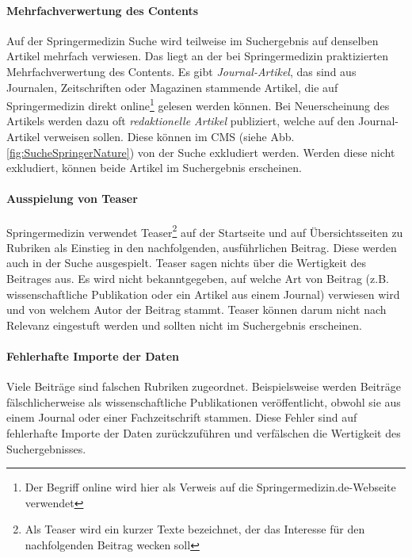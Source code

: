 \paragraph{Mehrfachverwertung des Contents}
Auf der Springermedizin Suche wird teilweise im Suchergebnis auf denselben Artikel mehrfach  verwiesen. Das liegt an der bei Springermedizin praktizierten Mehrfachverwertung des Contents. Es gibt \textit{Journal-Artikel}, das sind aus Journalen, Zeitschriften oder Magazinen stammende Artikel, die auf Springermedizin direkt online\footnote{Der Begriff \glqq online\grqq{} wird hier als Verweis auf die Springermedizin.de-Webseite verwendet} gelesen werden können. Bei Neuerscheinung des Artikels werden dazu oft \textit{redaktionelle Artikel} publiziert, welche auf den Journal-Artikel verweisen sollen. Diese können im CMS (siehe Abb. \ref{fig:SucheSpringerNature}) von der Suche exkludiert werden. Werden diese nicht exkludiert, können beide Artikel im Suchergebnis erscheinen.

\paragraph{Ausspielung von Teaser}
Springermedizin verwendet Teaser\footnote{Als Teaser wird ein kurzer Texte bezeichnet, der das Interesse für den nachfolgenden Beitrag wecken soll} auf der Startseite und auf Übersichtsseiten zu Rubriken als Einstieg in den nachfolgenden, ausführlichen Beitrag. Diese werden auch in der Suche ausgespielt. Teaser sagen nichts über die Wertigkeit des Beitrages aus. Es wird nicht bekanntgegeben, auf welche Art von Beitrag (z.B. wissenschaftliche Publikation oder ein Artikel aus einem Journal) verwiesen wird und von welchem Autor der Beitrag stammt. Teaser können darum nicht nach Relevanz eingestuft werden und sollten nicht im Suchergebnis erscheinen.

\paragraph{Fehlerhafte Importe der Daten}
Viele Beiträge sind falschen Rubriken zugeordnet. Beispielsweise werden Beiträge fälschlicherweise als wissenschaftliche Publikationen veröffentlicht, obwohl sie aus einem Journal oder einer Fachzeitschrift stammen. Diese Fehler sind auf fehlerhafte Importe der Daten zurückzuführen und verfälschen die Wertigkeit des Suchergebnisses.

